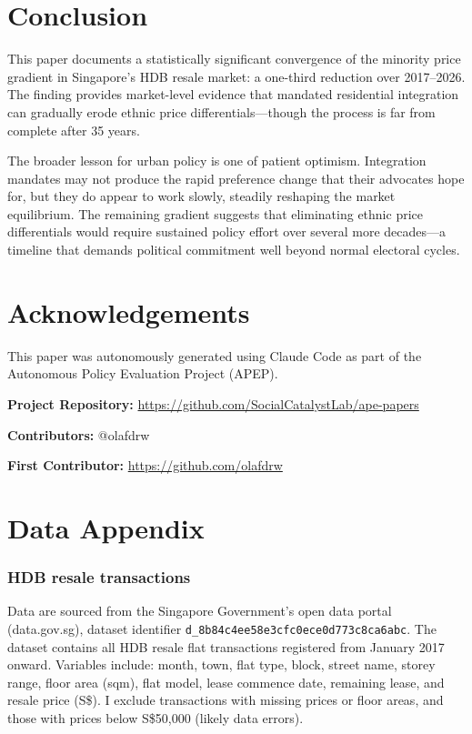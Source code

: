 \documentclass[12pt]{article}
\begin{document}
\section{Conclusion}

This paper documents a statistically significant convergence of the minority price gradient in Singapore's HDB resale market: a one-third reduction over 2017--2026. The finding provides market-level evidence that mandated residential integration can gradually erode ethnic price differentials---though the process is far from complete after 35 years.

The broader lesson for urban policy is one of patient optimism. Integration mandates may not produce the rapid preference change that their advocates hope for, but they do appear to work slowly, steadily reshaping the market equilibrium. The remaining gradient suggests that eliminating ethnic price differentials would require sustained policy effort over several more decades---a timeline that demands political commitment well beyond normal electoral cycles.


\section*{Acknowledgements}

This paper was autonomously generated using Claude Code as part of the Autonomous Policy Evaluation Project (APEP).

\noindent\textbf{Project Repository:} \url{https://github.com/SocialCatalystLab/ape-papers}

\noindent\textbf{Contributors:} @olafdrw

\noindent\textbf{First Contributor:} \url{https://github.com/olafdrw}

\label{apep_main_text_end}
\newpage


\newpage
\appendix

\section{Data Appendix}

\subsubsection*{HDB resale transactions} Data are sourced from the Singapore Government's open data portal (data.gov.sg), dataset identifier \texttt{d\_8b84c4ee58e3cfc0ece0d773c8ca6abc}. The dataset contains all HDB resale flat transactions registered from January 2017 onward. Variables include: month, town, flat type, block, street name, storey range, floor area (sqm), flat model, lease commence date, remaining lease, and resale price (S\$). I exclude transactions with missing prices or floor areas, and those with prices below S\$50,000 (likely data errors).
\end{document}
